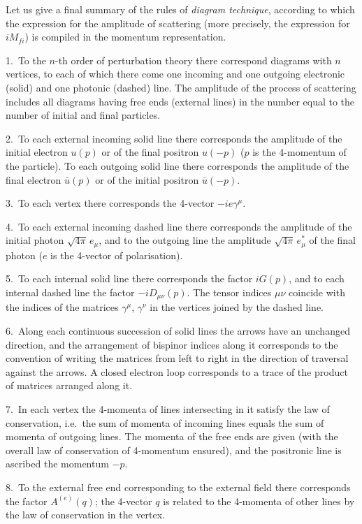 Let us give a final summary of the rules of \textit{diagram technique}, according to which the expression for the amplitude of scattering (more precisely, the expression for $iM_{fi}$) is compiled in the momentum representation.

1.~To the $n$-th order of perturbation theory there correspond diagrams with $n$ vertices, to each of which there come one incoming and one outgoing electronic (solid) and one photonic (dashed) line. The amplitude of the process of scattering includes all diagrams having free ends (external lines) in the number equal to the number of initial and final particles.

2.~To each external incoming solid line there corresponds the amplitude of the initial electron $u(p)$ or of the final positron $u(-p)$ ($p$ is the 4-momentum of the particle). To each outgoing solid line there corresponds the amplitude of the final electron $\bar{u}(p)$ or of the initial positron $\bar{u}(-p)$.

3.~To each vertex there corresponds the 4-vector $-ie\gamma^\mu$.

4.~To each external incoming dashed line there corresponds the amplitude of the initial photon $\sqrt{4\pi}\,e_\mu$, and to the outgoing line the amplitude $\sqrt{4\pi}\,e^*_\mu$ of the final photon ($e$ is the 4-vector of polarisation).

5.~To each internal solid line there corresponds the factor $iG(p)$, and to each internal dashed line the factor $-iD_{\mu\nu}(p)$. The tensor indices $\mu\nu$ coincide with the indices of the matrices $\gamma^\mu$, $\gamma^\nu$ in the vertices joined by the dashed line.

6.~Along each continuous succession of solid lines the arrows have an unchanged direction, and the arrangement of bispinor indices along it corresponds to the convention of writing the matrices from left to right in the direction of traversal against the arrows. A closed electron loop corresponds to a trace of the product of matrices arranged along it.

7.~In each vertex the 4-momenta of lines intersecting in it satisfy the law of conservation, i.e.\ the sum of momenta of incoming lines equals the sum of momenta of outgoing lines. The momenta of the free ends are given (with the overall law of conservation of 4-momentum ensured), and the positronic line is ascribed the momentum $-p$.

8.~To the external free end corresponding to the external field there corresponds the factor $A^{(e)}(q)$; the 4-vector $q$ is related to the 4-momenta of other lines by the law of conservation in the vertex.

